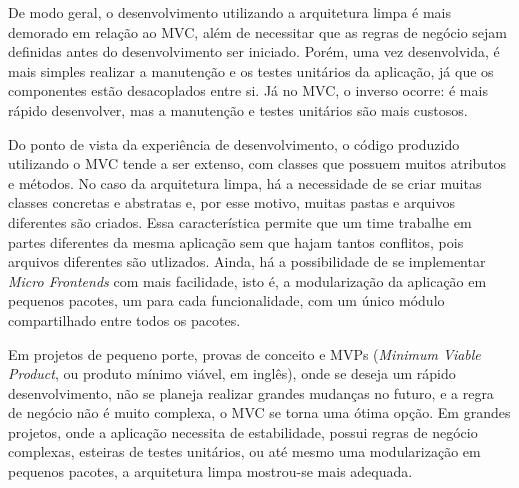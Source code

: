 De modo geral, o desenvolvimento utilizando a arquitetura limpa é mais demorado em relação ao MVC, além de necessitar que as regras de negócio sejam definidas antes do desenvolvimento ser iniciado.
Porém, uma vez desenvolvida, é mais simples realizar a manutenção e os testes unitários da aplicação, já que os componentes estão desacoplados entre si.
Já no MVC, o inverso ocorre: é mais rápido desenvolver, mas a manutenção e testes unitários são mais custosos.

Do ponto de vista da experiência de desenvolvimento, o código produzido utilizando o MVC tende a ser extenso, com classes que possuem muitos atributos e métodos.
No caso da arquitetura limpa, há a necessidade de se criar muitas classes concretas e abstratas e, por esse motivo, muitas pastas e arquivos diferentes são criados.
Essa característica permite que um time trabalhe em partes diferentes da mesma aplicação sem que hajam tantos conflitos, pois arquivos diferentes são utlizados.
Ainda, há a possibilidade de se implementar \emph{Micro Frontends} com mais facilidade, isto é, a modularização da aplicação em pequenos pacotes, um para cada funcionalidade, com um único módulo compartilhado entre todos os pacotes.

Em projetos de pequeno porte, provas de conceito e MVPs (\emph{Minimum Viable Product}, ou produto mínimo viável, em inglês), onde se deseja um rápido desenvolvimento, não se planeja realizar grandes mudanças no futuro, e a regra de negócio não é muito complexa, o MVC se torna uma ótima opção.
Em grandes projetos, onde a aplicação necessita de estabilidade, possui regras de negócio complexas, esteiras de testes unitários, ou até mesmo uma modularização em pequenos pacotes, a arquitetura limpa mostrou-se mais adequada.